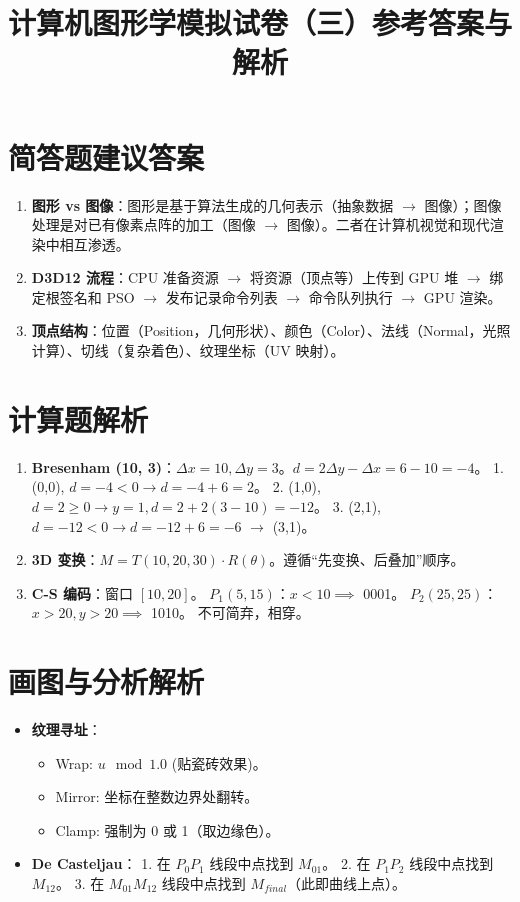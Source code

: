 \documentclass[UTF8]{ctexart}
\title{计算机图形学模拟试卷（三）参考答案与解析}
\date{}
\begin{document}
\maketitle

\section{简答题建议答案}
\begin{enumerate}
    \item \textbf{图形 vs 图像}：图形是基于算法生成的几何表示（抽象数据 $\to$ 图像）；图像处理是对已有像素点阵的加工（图像 $\to$ 图像）。二者在计算机视觉和现代渲染中相互渗透。
    \item \textbf{D3D12 流程}：CPU 准备资源 $\to$ 将资源（顶点等）上传到 GPU 堆 $\to$ 绑定根签名和 PSO $\to$ 发布记录命令列表 $\to$ 命令队列执行 $\to$ GPU 渲染。
    \item \textbf{顶点结构}：位置（Position，几何形状）、颜色（Color）、法线（Normal，光照计算）、切线（复杂着色）、纹理坐标（UV 映射）。
\end{enumerate}

\section{计算题解析}
\begin{enumerate}
    \item \textbf{Bresenham (10, 3)}：$\Delta x=10, \Delta y=3$。$d = 2\Delta y - \Delta x = 6 - 10 = -4$。
    1. (0,0), $d=-4 < 0 \to d = -4+6=2$。
    2. (1,0), $d=2 \ge 0 \to y=1, d = 2+2(3-10)=-12$。
    3. (2,1), $d=-12 < 0 \to d = -12+6=-6$ $\to$ (3,1)。
    
    \item \textbf{3D 变换}：$M = T(10, 20, 30) \cdot R(\theta)$。遵循“先变换、后叠加”顺序。
    
    \item \textbf{C-S 编码}：窗口 $[10,20]$。
    $P_1(5, 15)$：$x < 10 \implies$ 0001。
    $P_2(25, 25)$：$x > 20, y > 20 \implies$ 1010。
    不可简弃，相穿。
\end{enumerate}

\section{画图与分析解析}
\begin{itemize}
    \item \textbf{纹理寻址}：
    \begin{itemize}
        \item Wrap: $u \mod 1.0$ (贴瓷砖效果)。
        \item Mirror: 坐标在整数边界处翻转。
        \item Clamp: 强制为 0 或 1（取边缘色）。
    \end{itemize}
    \item \textbf{De Casteljau}：
    1. 在 $P_0P_1$ 线段中点找到 $M_{01}$。
    2. 在 $P_1P_2$ 线段中点找到 $M_{12}$。
    3. 在 $M_{01}M_{12}$ 线段中点找到 $M_{final}$（此即曲线上点）。
\end{itemize}
\end{document}
